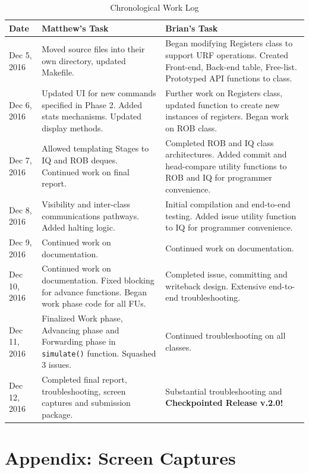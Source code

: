 \documentclass[12pt]{article}
\begin{document}
\begin{table}
\centering
\caption{Chronological Work Log}
\label{tab:worklog}
\begin{tabular}{l|p{2.75in}|p{2.75in}}
Date         	& Matthew's Task
				& Brian's Task \\
\hline
Dec 5, 2016  	& Moved source files into their own directory, updated Makefile.
				& Began modifying Registers class to support URF operations. Created Front-end, Back-end table, Free-list. Prototyped API functions to class. \\
Dec 6, 2016  	& Updated UI for new commands specified in Phase 2. Added stats mechanisms. Updated display methods.
				& Further work on Registers class, updated function to create new instances of registers. Began work on ROB class. \\
Dec 7, 2016		& Allowed templating Stages to IQ and ROB deques. Continued work on final report.
				& Completed ROB and IQ class architectures. Added commit and head-compare utility functions to ROB and IQ for programmer convenience. \\
Dec 8, 2016		& Visibility and inter-class communications pathways. Added halting logic.
				& Initial compilation and end-to-end testing. Added issue utility function to IQ for programmer convenience. \\
Dec 9, 2016		& Continued work on documentation.
				& Continued work on documentation.\\
Dec 10, 2016	& Continued work on documentation. Fixed blocking for advance functions. Began work phase code for all FUs.
				& Completed issue, committing and writeback design. Extensive end-to-end troubleshooting.\\
Dec 11, 2016	& Finalized Work phase, Advancing phase and Forwarding phase in \texttt{simulate()} function. Squashed 3 issues.
				& Continued troubleshooting on all classes.\\
Dec 12, 2016	& Completed final report, troubleshooting, screen captures and submission package.
				& Substantial troubleshooting and \textbf{Checkpointed Release v.2.0!}\\
\end{tabular}
\end{table}

\newpage
\appendix
\section{Appendix: Screen Captures}
\end{document}
